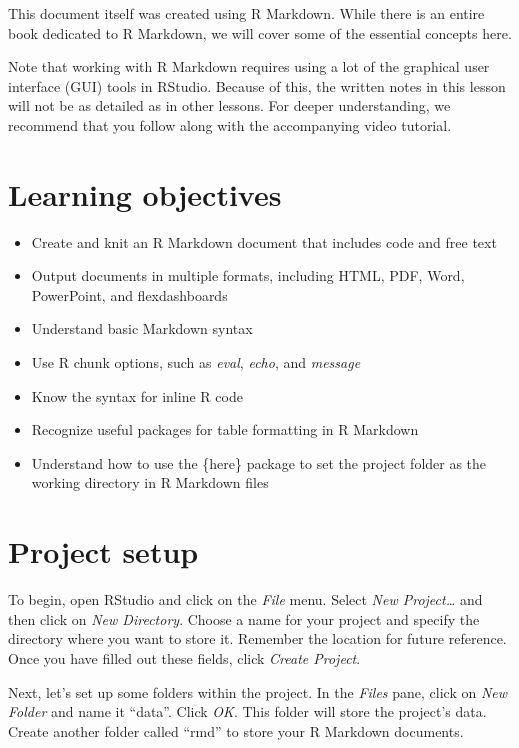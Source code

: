 \documentclass[
  letterpaper,
  DIV=11,
  numbers=noendperiod]{scrreprt}
\providecommand{\tightlist}{%
  \setlength{\itemsep}{0pt}\setlength{\parskip}{0pt}}\usepackage{longtable,booktabs,array}
\begin{document}
This document itself was created using R Markdown. While there is an
entire book dedicated to R Markdown, we will cover some of the essential
concepts here.

Note that working with R Markdown requires using a lot of the graphical
user interface (GUI) tools in RStudio. Because of this, the written
notes in this lesson will not be as detailed as in other lessons. For
deeper understanding, we recommend that you follow along with the
accompanying video tutorial.

\hypertarget{learning-objectives-4}{%
\section*{Learning objectives}\label{learning-objectives-4}}


\begin{itemize}
\tightlist
\item
  Create and knit an R Markdown document that includes code and free
  text
\item
  Output documents in multiple formats, including HTML, PDF, Word,
  PowerPoint, and flexdashboards
\item
  Understand basic Markdown syntax
\item
  Use R chunk options, such as \emph{eval}, \emph{echo}, and
  \emph{message}
\item
  Know the syntax for inline R code
\item
  Recognize useful packages for table formatting in R Markdown
\item
  Understand how to use the \{here\} package to set the project folder
  as the working directory in R Markdown files
\end{itemize}

\hypertarget{project-setup}{%
\section{Project setup}\label{project-setup}}

To begin, open RStudio and click on the \emph{File} menu. Select
\emph{New Project\ldots{}} and then click on \emph{New Directory}.
Choose a name for your project and specify the directory where you want
to store it. Remember the location for future reference. Once you have
filled out these fields, click \emph{Create Project}.

Next, let's set up some folders within the project. In the \emph{Files}
pane, click on \emph{New Folder} and name it ``data''. Click \emph{OK}.
This folder will store the project's data. Create another folder called
``rmd'' to store your R Markdown documents.
\end{document}
